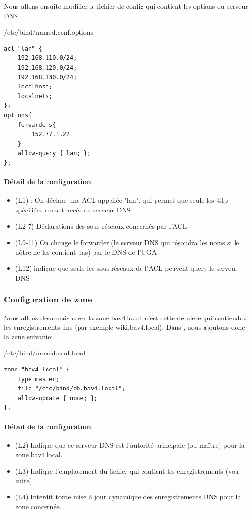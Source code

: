 \documentclass{article}
\begin{document}
Nous allons ensuite modifier le fichier de config  qui contient les options du serveur DNS.	
\begin{configbox}{/etc/bind/named.conf.options}
\begin{lstlisting}
acl "lan" {
	192.168.110.0/24;
	192.168.120.0/24;
	192.168.130.0/24;
	localhost;
	localnets;
};
options{ 
	forwarders{
		152.77.1.22
	}
	allow-query { lan; }; 
};
\end{lstlisting}
\end{configbox}
\paragraph{Détail de la configuration}
\begin{itemize}
	\item (L1)  : On déclare une ACL appellée "lan", qui permet que seule les @Ip spécifiées auront accès au serveur DNS
	\item (L2-7) Déclarations des sous-réseaux concernés par l'ACL
	\item (L9-11) On change le forwarder (le serveur DNS qui résoudra les noms si le nôtre ne les contient pas) par le DNS de l'UGA
	\item (L12)  indique que seuls les sous-réseaux de l'ACL peuvent query le serveur DNS
\end{itemize}

\subsubsection{Configuration de zone} 
Nous allons desormais créer la zone bav4.local, c'est cette derniere qui contiendra les enregistrements dns (par exemple wiki.bav4.local). Dans , nous ajoutons donc la zone suivante:

\begin{configbox}{/etc/bind/named.conf.local}
\begin{lstlisting}
zone "bav4.local" {
    type master;
    file "/etc/bind/db.bav4.local";
    allow-update { none; };
};
\end{lstlisting}
\end{configbox}
\paragraph{Détail de la configuration}
\begin{itemize}
	\item (L2) Indique que ce serveur DNS est l'autorité principale (ou maître) pour la zone bav4.local.
	\item (L3) Indique l'emplacement du fichier qui contient les enregistrements (voir suite)
	\item (L4) Interdit toute mise à jour dynamique des enregistrements DNS pour la zone concernée.
\end{itemize}
\end{document}
